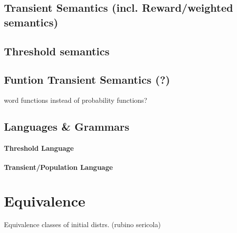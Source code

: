         
        
        \subsection{Transient Semantics (incl. Reward/weighted semantics)}
            
            \begin{definition}
            \end{definition}
                       
        
        \subsection{Threshold semantics}
            
        
        \subsection{Funtion Transient Semantics (?)}
        word functions instead of probability functions?
           
        
        
       
        
    \subsection{Languages \& Grammars}
        \paragraph{Threshold Language}
        
        \paragraph{Transient/Population Language}
        
        
    \section{Equivalence }
            \begin{definition}
            
        \end{definition}
        
        Equivalence classes of initial distrs. (rubino sericola)
        
